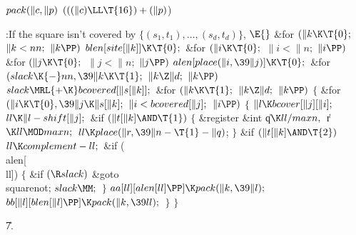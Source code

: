 \Y\B\4\D$\\{pack}(\|c,\|p)$ \5
$(((\|c)\LL\T{16})+(\|p){}$)\par
\Y\B\4:If the square isn't covered by $\{(s_1,t_1),\ldots,(s_d,t_d)\}$, %
\X${}\E{}$\6
\&{for} ${}(\|k\K\T{0};{}$ ${}\|k<\\{nn};{}$ ${}\|k\PP){}$\1\5
${}\\{blen}[\\{site}[\|k]]\K\T{0};{}$\2\6
\&{for} ${}(\|i\K\T{0};{}$ ${}\|i<\|n;{}$ ${}\|i\PP){}$\1\6
\&{for} ${}(\|j\K\T{0};{}$ ${}\|j<\|n;{}$ ${}\|j\PP){}$\1\5
${}\\{alen}[\\{place}(\|i,\39\|j)]\K\T{0};{}$\2\2\6
\&{for} ${}(\\{slack}\K{-}\\{nn},\39\|k\K\T{1};{}$ ${}\|k\Z\|d;{}$ ${}\|k%
\PP){}$\1\5
${}\\{slack}\MRL{+{\K}}\\{bcovered}[\|s[\|k]];{}$\2\6
\&{for} ${}(\|k\K\T{1};{}$ ${}\|k\Z\|d;{}$ ${}\|k\PP){}$\5
${}\{{}$\1\6
\&{for} ${}(\|i\K\T{0},\39\|j\K\|s[\|k];{}$ ${}\|i<\\{bcovered}[\|j];{}$ ${}\|i%
\PP){}$\5
${}\{{}$\1\6
${}\|l\K\\{bcover}[\|j][\|i];{}$\6
${}\\{ll}\K\|l-\\{shift}[\|j];{}$\6
\&{if} ${}(\|t[\|k]\AND\T{1}){}$\5
${}\{{}$\1\6
\&{register} \&{int} \|q${}\K\\{ll}/\\{maxn},{}$ \|r${}\K\\{ll}\MOD\\{maxn};{}$%
\7
${}\\{ll}\K\\{place}(\|r,\39\|n-\T{1}-\|q){}$;\6
\4${}\}{}$\2\6
\&{if} ${}(\|t[\|k]\AND\T{2}){}$\1\5
${}\\{ll}\K\\{complement}-\\{ll};{}$\2\6
\&{if} (\\{alen}[\\{ll}])\5
${}\{{}$\1\6
\&{if} ${}(\R\\{slack}){}$\1\5
\&{goto} \\{squarenot};\2\6
${}\\{slack}\MM;{}$\6
\4${}\}{}$\2\6
${}\\{aa}[\\{ll}][\\{alen}[\\{ll}]\PP]\K\\{pack}(\|k,\39\|l);{}$\6
${}\\{bb}[\|l][\\{blen}[\|l]\PP]\K\\{pack}(\|k,\39\\{ll});{}$\6
\4${}\}{}$\2\6
\4${}\}{}$\2\par
\U7.\fi

